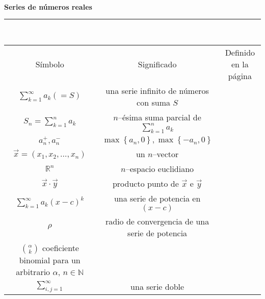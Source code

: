 \documentclass[a4,paper]{article}
\newcommand{\centrado}[1]{
	\ \\[.1\baselineskip]
	{\Large\bfseries\centering #1\par}
	\hrule
	\ \\[.1\baselineskip]
}
\begin{document}
\centrado{Series de números reales}
\begin{tabular}{ccc}
	Símbolo & Significado & Definido en la página \\
	$\sum_{k=1}^{\infty}a_{k} (=S)$ & una serie infinito de números con suma $S$ & \\
	$S_{n}=\sum_{k=1}^{n}a_{k}$ & $n$--ésima suma parcial de $\sum_{k=1}^{n}a_{k}$ & \\
	$a^{+}_{n},a^{-}_{n}$ & $\max\left\{a_{n},0\right\},\max\left\{-a_{n},0\right\}$ & \\
	$\vec{x}=\left(x_{1},x_{2},\ldots,x_{n}\right)$ & un $n$--vector & \\
	$\mathbb{R}^{n}$ & $n$--espacio euclidiano & \\
	$\vec{x}\cdot\vec{y}$ & producto punto de $\vec{x}$ e $\vec{y}$ & \\
	$\sum_{k=1}^{\infty}a_{k}{\left(x-c\right)}^{k}$ & una serie de potencia en $\left(x-c\right)$ & \\
	$\rho$ & radio de convergencia de una serie de potencia & \\
	$\binom{\alpha}{k}$ coeficiente binomial para un arbitrario $\alpha$, $n\in\mathbb{N}$ & \\
	$\sum_{i,j=1}^{\infty}$ & una serie doble & \\
\end{tabular}
\end{document}
